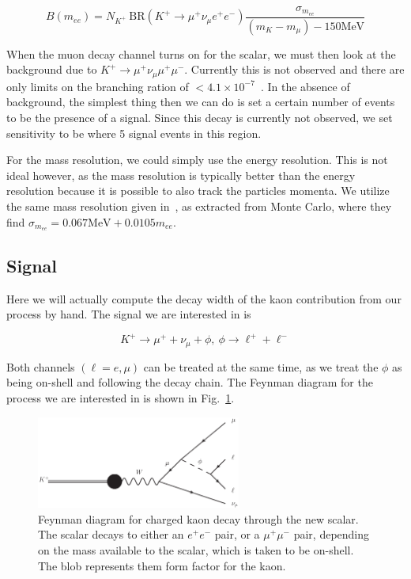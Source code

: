 \begin{equation}
B(m_{ee}) = N_{K^+}~\textrm{BR}(K^+ \rightarrow \mu^+ \nu_\mu e^+ e^-) \frac{\sigma_{m_{ee}}}{(m_K - m_\mu) - 150\textrm{MeV}}
\end{equation}

When the muon decay channel turns on for the scalar, we must then look at the background due to $K^+ \rightarrow \mu^+ \nu_\mu \mu^+ \mu^-$.
Currently this is not observed and there are only limits on the branching ration of $< 4.1 \times 10^{-7}$~\cite{Agashe:2014kda}.
In the absence of background, the simplest thing then we can do is set a certain number of events to be the presence of a signal.
Since this decay is currently not observed, we set sensitivity to be where 5 signal events in this region.

For the mass resolution, we could simply use the energy resolution.
This is not ideal however, as the mass resolution is typically better than the energy resolution because it is possible to also track the particles momenta.
We utilize the same mass resolution given in~\cite{Batley:2015lha}, as extracted from Monte Carlo, where they find $\sigma_{m_{ee}} = 0.067\textrm{MeV} + 0.0105 m_{ee}$.

\subsection{Signal}
Here we will actually compute the decay width of the kaon contribution from our process by hand.
The signal we are interested in is

\begin{equation}
    K^+ \rightarrow \mu^+ + \nu_\mu + \phi,~\phi \rightarrow \ell^+ + \ell^-
\end{equation}

\noindent Both channels $(\ell = e, \mu)$ can be treated at the same time, as we treat the $\phi$ as being on-shell and following the decay chain.
The Feynman diagram for the process we are interested in is shown in Fig.~\ref{fig:kaon_decay_signal}.

\begin{figure}[h]
    \centering
    \includegraphics[width=0.6\textwidth]{Figures/feynman_diagrams/k_munull_scalar}
    \caption{Feynman diagram for charged kaon decay through the new scalar. The scalar decays to either an $e^+ e^-$ pair, or a $\mu^+ \mu^-$ pair, depending on the mass available to the scalar, which is taken to be on-shell. The blob represents them form factor for the kaon.}
    \label{fig:kaon_decay_signal}
\end{figure}

